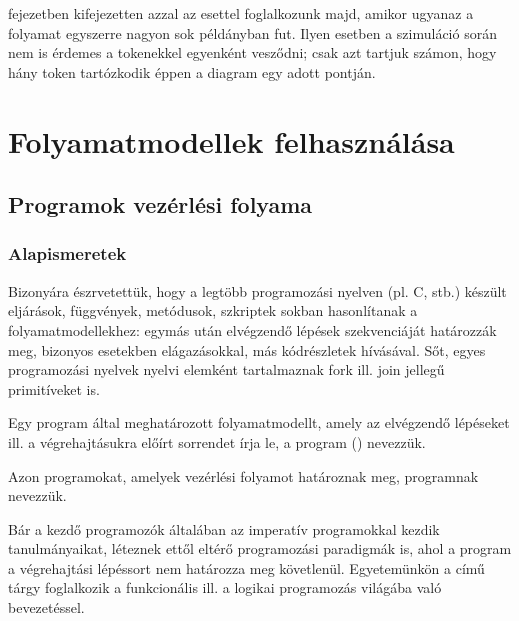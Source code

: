  fejezetben kifejezetten azzal az esettel foglalkozunk majd, amikor ugyanaz a folyamat egyszerre nagyon sok példányban fut. Ilyen esetben a szimuláció során nem is érdemes a tokenekkel egyenként vesződni; csak azt tartjuk számon, hogy hány token tartózkodik éppen a diagram egy adott pontján.






\section{Folyamatmodellek felhasználása}

\subsection{Programok vezérlési folyama}

\subsubsection{Alapismeretek}
Bizonyára észrvetettük, hogy a legtöbb programozási nyelven (pl. C, \cpp stb.) készült eljárások, függvények, metódusok, szkriptek sokban hasonlítanak a folyamatmodellekhez: egymás után elvégzendő lépések szekvenciáját határozzák meg, bizonyos esetekben elágazásokkal, más kódrészletek hívásával. Sőt, egyes programozási nyelvek nyelvi elemként tartalmaznak fork ill. join jellegű primitíveket is.  

\begin{definicio}
Egy program által meghatározott folyamatmodellt, amely az elvégzendő lépéseket ill. a végrehajtásukra előírt sorrendet írja le, a program  () nevezzük. 
\end{definicio}

\begin{definicio}
Azon programokat, amelyek vezérlési folyamot határoznak meg,  programnak nevezzük.  
\end{definicio}

\begin{megjegyzes}
	Bár a kezdő programozók általában az imperatív programokkal kezdik tanulmányaikat, léteznek ettől eltérő programozási paradigmák is, ahol a program a végrehajtási lépéssort nem határozza meg követlenül. Egyetemünkön a \deklapo című tárgy foglalkozik a funkcionális ill. a logikai programozás világába való bevezetéssel.
\end{megjegyzes}


